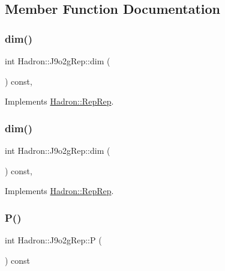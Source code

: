 \subsection{Member Function Documentation}
\mbox{\label{structHadron_1_1J9o2gRep_a82b4805525de58991ef3a0f533d3586e}} 
\subsubsection{\texorpdfstring{dim()}{dim()}\hspace{0.1cm}{\footnotesize\ttfamily [1/2]}}
{\footnotesize\ttfamily int Hadron\+::\+J9o2g\+Rep\+::dim (\begin{DoxyParamCaption}{ }\end{DoxyParamCaption}) const\hspace{0.3cm}{\ttfamily [inline]}, {\ttfamily [virtual]}}



Implements \mbox{\hyperlink{structHadron_1_1RepRep_a92c8802e5ed7afd7da43ccfd5b7cd92b}{Hadron\+::\+Rep\+Rep}}.

\mbox{\label{structHadron_1_1J9o2gRep_a82b4805525de58991ef3a0f533d3586e}} 
\subsubsection{\texorpdfstring{dim()}{dim()}\hspace{0.1cm}{\footnotesize\ttfamily [2/2]}}
{\footnotesize\ttfamily int Hadron\+::\+J9o2g\+Rep\+::dim (\begin{DoxyParamCaption}{ }\end{DoxyParamCaption}) const\hspace{0.3cm}{\ttfamily [inline]}, {\ttfamily [virtual]}}



Implements \mbox{\hyperlink{structHadron_1_1RepRep_a92c8802e5ed7afd7da43ccfd5b7cd92b}{Hadron\+::\+Rep\+Rep}}.

\mbox{\label{structHadron_1_1J9o2gRep_a6c3ba214106f1ad5c9e0923094b620f1}} 
\subsubsection{\texorpdfstring{P()}{P()}\hspace{0.1cm}{\footnotesize\ttfamily [1/2]}}
{\footnotesize\ttfamily int Hadron\+::\+J9o2g\+Rep\+::P (\begin{DoxyParamCaption}{ }\end{DoxyParamCaption}) const\hspace{0.3cm}{\ttfamily [inline]}}

